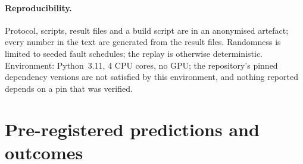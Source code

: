 \documentclass[runningheads]{llncs}
\begin{document}
\paragraph{Reproducibility.} Protocol, scripts, result files and a build script are in an anonymised artefact; every number in the text are generated from the result files. Randomness is limited to seeded fault schedules; the replay is otherwise deterministic. Environment: Python~3.11, 4 CPU cores, no GPU; the repository's pinned dependency versions are not satisfied by this environment, and nothing reported depends on a pin that was verified.




\clearpage
\appendix
\section{Pre-registered predictions and outcomes}

\end{document}
